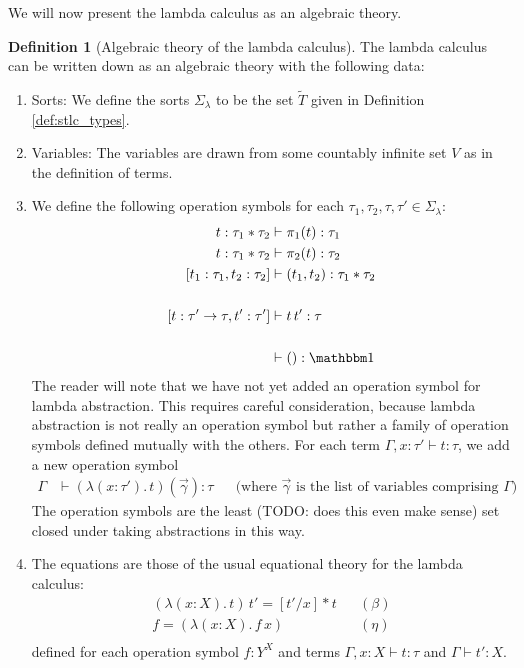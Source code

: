 \documentclass[12pt,twoside]{reedthesis}
\theoremstyle{definition}
\newtheorem{definition}{Definition}
\theoremstyle{remark}
\theoremstyle{plain}
\begin{document}
We will now present the lambda calculus as an algebraic theory.
\begin{definition}[Algebraic theory of the lambda calculus]
  The lambda calculus can be written down as an algebraic theory with the
  following data:
  \begin{enumerate}
    \item Sorts: We define the sorts \( \Sigma_{\lambda}\) to be the set
    \( \widetilde{T} \) given in Definition \ref{def:stlc_types}.
    \item Variables: The variables are drawn from some countably infinite set
          $V$ as in the definition of terms.
    \item We define the following operation symbols for each
          \(\tau_{1},\tau_{2},\tau,\tau' \in \Sigma_{\lambda}\):
          \begin{align*}
            t : \tau_{1} * \tau_{2} &\vdash \pi_{1}(t) : \tau_{1} \\
            t : \tau_{1} * \tau_{2} &\vdash \pi_{2}(t) : \tau_{2} \\
            [t_{1} : \tau_{1}, t_{2} : \tau_{2}] &\vdash (t_{1},t_{2}) : \tau_{1} * \tau_{2} \\
            \\
            [t : \tau' \rightarrow \tau , t' : \tau'] &\vdash t\, t' : \tau \\\\
            &\vdash () : \termob\\
          \end{align*}
          The reader will note that we have not yet added an operation symbol
          for lambda abstraction. This requires careful consideration, because
          lambda abstraction is not really an operation symbol but rather a
          family of operation symbols defined mutually with the others. For each
          term \( \Gamma, x:\tau' \vdash t : \tau \), we add a new operation symbol
         \begin{align*}
           \Gamma &\vdash (\lambda (x:\tau').\, t)(\overrightarrow{\gamma}) : \tau && \text{(where $\overrightarrow{\gamma}$ is the list of variables comprising $\Gamma$)}
         \end{align*}
          The operation symbols are the least (TODO: does this even make sense)
          set closed under taking abstractions in this way.
    \item The equations are those of the usual equational theory for the lambda
    calculus:
    \begin{align*}
      (\lambda (x:X).\, t)\, t' = [t'/x]*t && (\beta) \\
      f = (\lambda (x:X).\, f\, x) && (\eta)\\
    \end{align*}
    defined for each operation symbol \( f : Y^{X}\) and terms
    \( \Gamma, x : X \vdash t : \tau \) and \( \Gamma \vdash t' : X\).
  \end{enumerate}
\end{definition}
\end{document}
